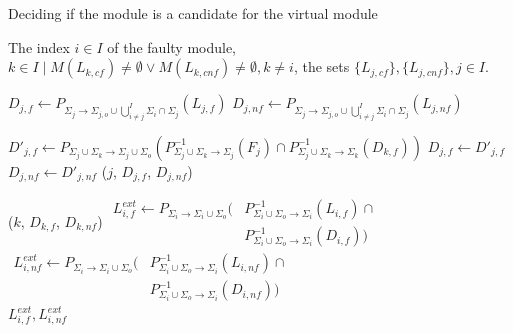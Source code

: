 \documentclass[a4paper, 10pt, conference]{ieeeconf}
\begin{document}
\begin{algorithm} Deciding if the module is a candidate for the virtual module
\label{alg:propagate-d}
\begin{algorithmic}[1]
	\Require The index  $i \in I$ of the faulty module, 
	$k \in I \mid M(L_{k,cf}) \neq \emptyset \lor M(L_{k,cnf}) \neq
	\emptyset, k \neq i$, the sets $\{L_{j,cf}\}, \{L_{j,cnf}\}, j \in I$.

	\label{alg:fco_init}
		\State $D_{j,f} \leftarrow
			P_{\Sigma_j \rightarrow \Sigma_{j,o} \cup 
			\bigcup_{i\neq j}^I \Sigma_i\cap \Sigma_j}(L_{j,f})$
		\State $D_{j,nf} \leftarrow
			P_{\Sigma_j \rightarrow \Sigma_{j,o} \cup 
			\bigcup_{i\neq j}^I \Sigma_i\cap \Sigma_j}(L_{j,nf})$
	\EndFor
	
			\State $D'_{j,f} \leftarrow 
			P_{\Sigma_j \cup \Sigma_k \rightarrow \Sigma_j \cup \Sigma_o}
			(P_{\Sigma_j \cup \Sigma_k \rightarrow \Sigma_j}^{-1}(F_j) 
			\cap 
			P_{\Sigma_j \cup \Sigma_k \rightarrow \Sigma_k}^{-1}(D_{k,f}))$
				\State $D_{j,f}\leftarrow D'_{j,f}$
				\State $D_{j,nf}\leftarrow D'_{j,nf}$
				\State {}($j$, $D_{j,f}$, $D_{j,nf}$)
			\EndIf
		\EndFor 
	\EndProcedure
	
	\State {}($k$, $D_{k,f}$, $D_{k,nf}$)
	\label{alg:fco_enter_recursion}
	\State$
	\label{alg:fco_finalize}
	\begin{array}{ll}
	L_{i,f}^{ext} \leftarrow 
	P_{\Sigma_i \rightarrow \Sigma_i \cup \Sigma_o} ( &  
	P_{\Sigma_i \cup \Sigma_o \rightarrow \Sigma_i}^{-1}(L_{i,f}) \cap \\ 
	& 
	P_{\Sigma_i \cup \Sigma_o \rightarrow \Sigma_i}^{-1}(D_{i,f}))
	\end{array}
	$
	\State$
	\begin{array}{ll}
	L_{i,nf}^{ext} \leftarrow 
	P_{\Sigma_i \rightarrow \Sigma_i \cup \Sigma_o} ( &  
	P_{\Sigma_i \cup \Sigma_o \rightarrow \Sigma_i}^{-1}(L_{i,nf}) \cap \\ 
	& 
	P_{\Sigma_i \cup \Sigma_o \rightarrow \Sigma_i}^{-1}(D_{i,nf}))
	\end{array}
	$
	\\
	\Return $L_{i,f}^{ext}, L_{i,nf}^{ext}$
\end{algorithmic}
\end{algorithm}
\end{document}
